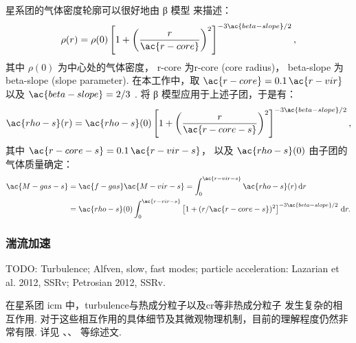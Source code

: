 星系团的气体密度轮廓可以很好地由 β 模型 \cite{cavaliere1976} 来描述：
\begin{equation}
  \label{eq:beta-model}
  \rho(r)
    = \rho(0) \left[ 1 + \left(
      \frac{r}{\ac{r-core}} \right)^2 \right]^{-3\ac{beta-slope}/2} ,
\end{equation}
其中
$\rho(0)$ 为中心处的气体密度，
\ac{r-core} 为\acl{r-core} (core radius)，
\ac{beta-slope} 为\acl{beta-slope} (slope parameter).
在本工作中，取 $\ac{r-core} = 0.1 \,\ac{r-vir}$ \cite{sanderson2003}
以及 $\ac{beta-slope} = 2/3$ \cite{jones1984}.
将 β 模型应用于上述子团，于是有：
\begin{equation}
  \ac{rho-s}(r)
    = \ac{rho-s}(0) \left[ 1 + \left(
      \frac{r}{\ac{r-core-s}} \right)^2 \right]^{-3\ac{beta-slope}/2} ,
\end{equation}
其中
$\ac{r-core-s} = 0.1 \,\ac{r-vir-s}$，
以及 $\ac{rho-s}(0)$ 由子团的气体质量确定：
\begin{align}
  \ac{M-gas-s}
    & = \ac{f-gas} \ac{M-vir-s}
      = \int_0^{\ac{r-vir-s}} \ac{rho-s}(r) \,\D{r}  \\
    & = \ac{rho-s}(0) \int_0^{\ac{r-vir-s}}
        \left[ 1 + (r / \ac{r-core-s})^2 \right]^{-3\ac{beta-slope}/2}
        \,\D{r} .
\end{align}

\subsubsection{湍流加速}

TODO:
Turbulence; Alfven, slow, fast modes; particle acceleration:
Lazarian et al. 2012, SSRv;
Petrosian 2012, SSRv.

在星系团 \ac{icm} 中，\ac{turbulence}与热成分粒子以及\ac{cr}等非热成分粒子
发生复杂的相互作用.
对于这些相互作用的具体细节及其微观物理机制，目前的理解程度仍然非常有限.
详见 、、
 等综述文.

